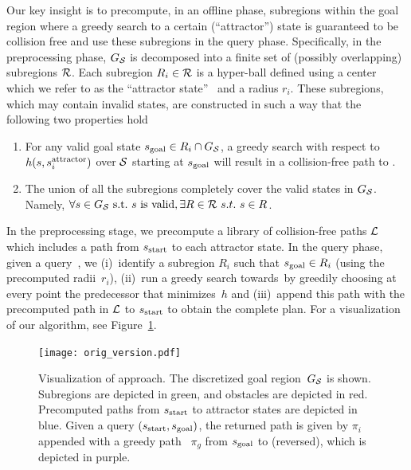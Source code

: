 \documentclass[a4paper]{report}
\begin{document}
Our key insight is to precompute, in an offline phase, subregions within the goal region where a greedy search to a certain (``attractor'') state is guaranteed to be collision free and use these subregions in the query phase.
Specifically, in the preprocessing phase, $G_\mathcal{S}$ is decomposed into a finite set of (possibly overlapping) subregions $\mathcal{R}$.
Each subregion $R_i \in \mathcal{R}$ is a hyper-ball defined using a center which we refer to as the ``attractor state''~
\sAttract and a radius $r_i$.
These subregions, which may contain invalid states, are constructed in such a way that the following two properties hold
\begin{enumerate}[label={\textbf{P\arabic*}}]
  \item \label{property:1} For any valid goal state $s_{\text{goal}} \in R_i \cap G_\mathcal{S}$, a greedy search with respect to $h(s, s^{\text{attractor}}_i)$ over $\mathcal{S}$ starting at $s_{\text{goal}}$ will result in a collision-free path to \sAttract.
  \item \label{property:2} The union of all the subregions completely cover the valid states in $G_\mathcal{S}$. 
      Namely, $\forall s \in G_\mathcal{S}~\text{s.t.}~s~\text{is valid}, \exists R \in \mathcal{R} \ s.t. \ s \in R$.
\end{enumerate}

In the preprocessing stage, we precompute a library of collision-free paths $\mathcal{L}$ which includes a path from $s_{\textrm{start}}$ to each attractor state. 
In the query phase, given a query~\sGoal, we 
(i)~identify a subregion $R_i$ such that $s_{\text{goal}} \in R_i$ (using the precomputed radii~$r_i$),
(ii)~run a greedy search towards~\sAttract by greedily choosing at every point the predecessor that minimizes~$h$ and
(iii)~append this path with the precomputed path in $\mathcal{L}$ to $s_{\textrm{start}}$ to obtain the complete plan.
For a visualization of our algorithm, see Figure~\ref{fig:approach}.


\begin{figure}
\centering
 \texttt{[image: orig\_version.pdf]}
  \caption{
  Visualization of approach. The discretized goal region~$G_\mathcal{S}$ is shown. Subregions are depicted in green, and obstacles are depicted in red.
  Precomputed paths from $s_{\rm{start}}$ to attractor states are depicted in blue.
 Given a query $(s_{\rm{start}}, s_{\rm{goal}})$, the returned path is given by $\pi_i$ appended with a greedy path ~$\pi_g$ from $s_{\rm{goal}}$ to \sAttract (reversed), which is depicted in purple.
}
    \label{fig:approach}
\end{figure}
\end{document}
